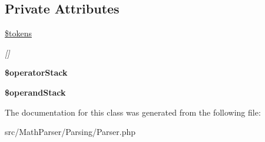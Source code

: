 \subsection*{Private Attributes}
\begin{DoxyCompactItemize}
\item 
\hypertarget{classMathParser_1_1Parsing_1_1Parser_ab20fd2f0971594016b8b631d29532284}{\hyperlink{classMathParser_1_1Parsing_1_1Parser_ab20fd2f0971594016b8b631d29532284}{\$tokens}}\label{classMathParser_1_1Parsing_1_1Parser_ab20fd2f0971594016b8b631d29532284}

\begin{DoxyCompactList}\small\item\em \mbox{[}\mbox{]} \end{DoxyCompactList}\item 
\hypertarget{classMathParser_1_1Parsing_1_1Parser_a6a691e6b115de82b04fa5b2fc828721b}{{\bfseries \$operator\-Stack}}\label{classMathParser_1_1Parsing_1_1Parser_a6a691e6b115de82b04fa5b2fc828721b}

\item 
\hypertarget{classMathParser_1_1Parsing_1_1Parser_a761f3ca46141d5e39e620520a2a876fa}{{\bfseries \$operand\-Stack}}\label{classMathParser_1_1Parsing_1_1Parser_a761f3ca46141d5e39e620520a2a876fa}

\end{DoxyCompactItemize}


The documentation for this class was generated from the following file\-:\begin{DoxyCompactItemize}
\item 
src/\-Math\-Parser/\-Parsing/Parser.\-php\end{DoxyCompactItemize}
